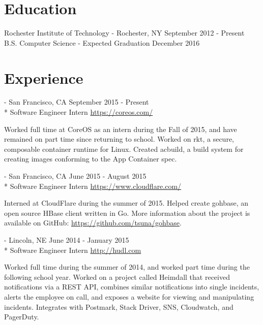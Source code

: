 \documentclass[letterpaper,margin,line,11pt]{resume}
\newcommand{\rurl}[1]{\hfill {\footnotesize \url{#1}}}
\newcommand{\rdate}[1]{\hfill {\small #1}}
\renewcommand{\employer}[5]{\item[#1] - #2 \rdate{#3} \\* #4 \rurl{#5}}
\begin{document}
\begin{resume}
\section{\mysidestyle Education}
    \begin{compactdesc}
        \item[Rochester Institute of Technology] - Rochester, NY \rdate{September 2012 - Present}
        \small
        \\B.S. Computer Science  - Expected Graduation December 2016
    \end{compactdesc}

\section{\mysidestyle Experience}
    \begin{asparadesc}
        \employer{CoreOS}{San Francisco, CA} {September 2015 - Present}{Software Engineer Intern}{https://coreos.com/}

        \small
        Worked full time at CoreOS as an intern during the Fall of 2015, and have remained on part time since returning to school. Worked on rkt, a secure, composable container runtime for Linux. Created acbuild, a build system for creating images conforming to the App Container spec.
        \normalsize
        \\

        \employer{CloudFlare}{San Francisco, CA} {June 2015 - August 2015}{Software Engineer Intern}{https://www.cloudflare.com/}

        \small
        Interned at CloudFlare during the summer of 2015. Helped create gohbase, an open source HBase client written in Go. More information about the project is available on GitHub: \url{https://github.com/tsuna/gohbase}.
        \normalsize
        \\

        \employer{Hudl}{Lincoln, NE}{June 2014 - January 2015}{Software Engineer Intern}{http://hudl.com}

        \small
        Worked full time during the summer of 2014, and worked part time during the following school year. Worked on a project called Heimdall that received notifications via a REST API, combines similar notifications into single incidents, alerts the employee on call, and exposes a website for viewing and manipulating incidents. Integrates with Postmark, Stack Driver, SNS, Cloudwatch, and PagerDuty.
        \normalsize
    \end{asparadesc}


\end{resume}
\end{document}
